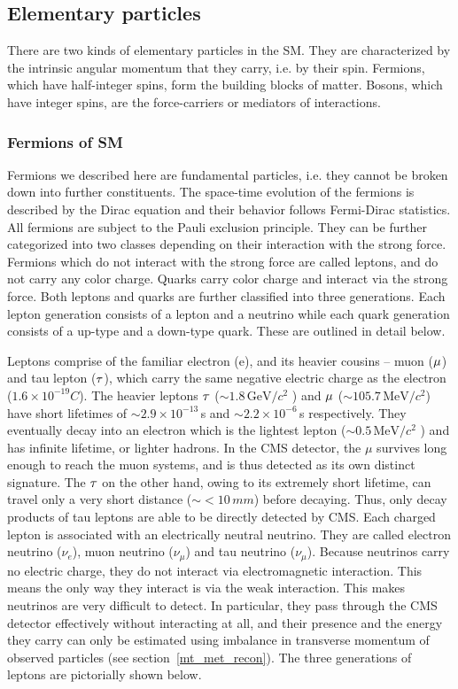 \subsection{Elementary particles}
There are two kinds of elementary particles in the SM. They are characterized by the intrinsic angular momentum that they carry, i.e. by their spin. Fermions, which have half-integer spins, form the building blocks of matter. Bosons, which have integer spins, are the force-carriers or mediators of interactions.

\subsubsection{Fermions of SM}
\label{fermions}
Fermions we described here are fundamental particles, i.e. they cannot be broken down into further constituents. The space-time evolution of the fermions is described by the Dirac equation and their behavior follows Fermi-Dirac statistics. All fermions are subject to the Pauli exclusion principle. They can be further categorized into two classes depending on their interaction with the strong force. Fermions which do not interact with the strong force are called leptons, and do not carry any color charge. Quarks carry color charge and interact via the strong force. Both leptons and quarks are further classified into three generations. Each lepton generation consists of a lepton and a neutrino while each quark generation consists of a up-type and a down-type quark. These are outlined in detail below.

Leptons comprise of the familiar electron (e), and its heavier cousins -- muon ($\mu$) and tau lepton ($\tau$), which carry the same negative electric charge as the electron ($1.6\times10^{-19} C$).  The heavier leptons $\tau$ ($\sim 1.8\,\mathrm{GeV}/c^2$ ) and $\mu$ ($\sim 105.7\,\mathrm{MeV}/c^2$) have short lifetimes of $\sim 2.9\times 10^{-13}\,$s and $\sim 2.2\times 10^{-6}\,$s respectively. They eventually decay into an electron which is the lightest lepton ($\sim 0.5\,\mathrm{MeV}/c^2$ ) and has infinite lifetime, or lighter hadrons. In the CMS detector, the $\mu$ survives long enough to reach the muon systems, and is thus detected as its own distinct signature. The $\tau$ on the other hand, owing to its extremely short lifetime, can travel only a very short distance ($\sim <10\,mm$) before decaying. Thus, only decay products of tau leptons are able to be directly detected by CMS. Each charged lepton is associated with an electrically neutral neutrino. They are called electron neutrino ($\nu_e$), muon neutrino ($\nu_{\mu}$) and tau neutrino ($\nu_{\mu}$). Because neutrinos carry no electric charge, they do not interact via electromagnetic interaction. This means the only way they interact is via the weak interaction. This makes neutrinos are very difficult to detect. In particular, they pass through the CMS detector effectively without interacting at all, and their presence and the energy they carry can only be estimated using imbalance in transverse momentum of observed particles (see section~\ref{mt_met_recon}). The three generations of leptons are pictorially shown below. 

